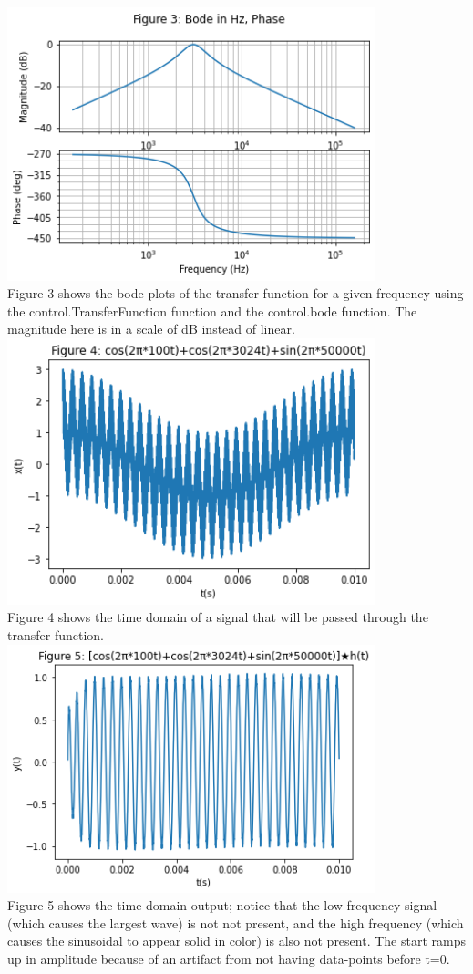 \documentclass[12pt,a4paper]{article}
\begin{document}
\includegraphics[width=0.8\textwidth]{Figure 3.png}\\
Figure 3 shows the bode plots of the transfer function for a given frequency using the control.TransferFunction function and the control.bode function. The magnitude here is in a scale of dB instead of linear.\\

\includegraphics[width=0.8\textwidth]{Figure 4.png}\\
Figure 4 shows the time domain of a signal that will be passed through the transfer function.\\

\includegraphics[width=0.8\textwidth]{Figure 5.png}\\
Figure 5 shows the time domain output; notice that the low frequency signal (which causes the largest wave) is not not present, and the high frequency (which causes the sinusoidal to appear solid in color) is also not present. The start ramps up in amplitude because of an artifact from not having data-points before t=0.\\
\end{document}
